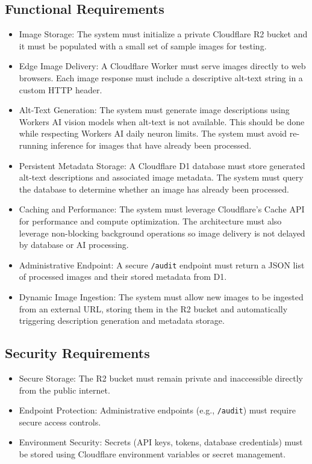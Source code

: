 \documentclass[12pt]{article}
\begin{document}
\subsection{Functional Requirements}
\begin{itemize}[leftmargin=*]
  \item Image Storage: The system must initialize a private Cloudflare R2 bucket and it must be populated with a small set of sample images for testing.
  \item Edge Image Delivery: A Cloudflare Worker must serve images directly to web browsers. Each image response must include a descriptive alt-text string in a custom HTTP header.
  \item Alt-Text Generation: The system must generate image descriptions using Workers AI vision models when alt-text is not available. This should be done while respecting Workers AI daily neuron limits. The system must avoid re-running inference for images that have already been processed.
  \item Persistent Metadata Storage: A Cloudflare D1 database must store generated alt-text descriptions and associated image metadata. The system must query the database to determine whether an image has already been processed.
  \item Caching and Performance: The system must leverage Cloudflare's Cache API for performance and compute optimization. The architecture must also leverage non-blocking background operations so image delivery is not delayed by database or AI processing.
  \item Administrative Endpoint: A secure \texttt{/audit} endpoint must return a JSON list of processed images and their stored metadata from D1.
  \item Dynamic Image Ingestion: The system must allow new images to be ingested from an external URL, storing them in the R2 bucket and automatically triggering description generation and metadata storage.
\end{itemize}

\subsection{Security Requirements}
\begin{itemize}[leftmargin=*]
  \item Secure Storage: The R2 bucket must remain private and inaccessible directly from the public internet.
  \item Endpoint Protection: Administrative endpoints (e.g., \texttt{/audit}) must require secure access controls.
  \item Environment Security: Secrets (API keys, tokens, database credentials) must be stored using Cloudflare environment variables or secret management.
\end{itemize}
\end{document}
